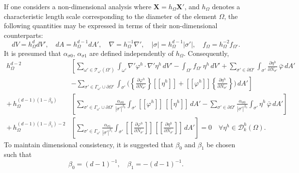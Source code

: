 	If one considers a non-dimensional analysis where $\mathbf{X} = h_\Omega \mathbf{X}'$, and $h_\Omega$ denotes a characteristic length scale corresponding to the diameter of the element $\Omega$, the following quantities may be expressed in terms of their non-dimensional counterparts:
    \begin{equation}
        dV = h_\Omega^d dV', \quad dA = h_\Omega^{d-1} dA', \quad \nabla = h_\Omega^{-1} \nabla', \quad |\sigma| = h_\Omega^{d-1} |\sigma'|, \quad f_{\Omega} = h_\Omega^{-2} f_{\Omega'}.
    \end{equation}
    It is presumed that $\alpha_{\sigma0}$, $\alpha_{\sigma1}$ are defined independently of $h_\Omega$. Consequently,
    \begin{align}
		h_\Omega^{d-2} & \left[ \sum_{\omega' \in \mathcal{T}_{\omega'} (\Omega')} \int_{\omega'} \nabla' \varphi^h \cdot \nabla' \eta^h \, dV' - \int_{\Omega'} f_{\Omega'} \, \eta^h \, dV' + \sum_{\sigma' \in \partial \Omega'} \int_{\sigma'} \frac{\partial \eta^h}{\partial N_{\sigma'}} \, \bar{\varphi} \, dA' \right. \nonumber \\ 
		& \left. - \sum_{\sigma' \in \Gamma_{\omega'} \cup \partial \Omega'} \int_{\sigma'} \bigg( \left\{ \frac{\partial \varphi^h}{\partial N_{\sigma'}} \right\} [\![ \eta^h ]\!] + [\![ \varphi^h ]\!] \left\{ \frac{\partial \eta^h}{\partial N_{\sigma'}} \right\}  \bigg) \, dA' \right] \nonumber \\ 
		+ \, h_\Omega^{(d-1)(1-\beta_0)} & \left[ \sum_{\sigma' \in \Gamma_{\omega'} \cup \partial \Omega'} \frac{\alpha_{\sigma0}}{|\sigma'|^{\beta_0}} \int_{\sigma'} [\![ \varphi^h ]\!] \, [\![ \eta^h ]\!] \, dA' - \sum_{\sigma' \in \partial \Omega'} \frac{\alpha_{\sigma0}}{|\sigma'|^{\beta_0}} \int_{\sigma'} \eta^h \, \bar{\varphi} \, dA' \right] \nonumber \\ 
		+ \, h_\Omega^{(d-1)(1-\beta_1)-2} & \left[ \sum_{\sigma' \in \Gamma_{\omega'}} \frac{\alpha_{\sigma1}}{|\sigma'|^{\beta_1}} \int_{\sigma'} \left[\!\!\left[ \frac{\partial \varphi^h}{\partial N_{\sigma'}} \right]\!\!\right] \, \left[\!\!\left[ \frac{\partial \eta^h}{\partial N_{\sigma'}} \right]\!\!\right] \, dA' \right] = 0 \quad \forall \eta^h \in \mathcal{D}^h_k (\Omega). 
		\label{eq:dg_nondim}
	\end{align}
	To maintain dimensional consistency, it is suggested that $\beta_0$ and $\beta_1$ be chosen such that
	\begin{equation}
		\beta_0 = (d-1)^{-1}, \quad \beta_1 = -(d-1)^{-1}.
	\end{equation}
	
